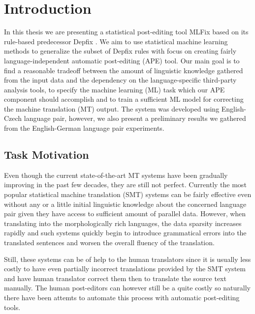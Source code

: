 \chapter{Introduction}

In this thesis we are presenting a statistical post-editing tool MLFix
based on its rule-based predecessor Depfix\cite{depfix:2014}
. We aim to use statistical machine learning methods to generalize the subset of Depfix rules
with focus on creating fairly language-independent automatic post-editing (APE) tool.
Our main goal is to find a reasonable tradeoff between the amount
of linguistic knowledge gathered from the input data and the dependency
on the language-specific third-party analysis tools, to specify the
machine learning (ML) task which our APE component should accomplish and to train
a sufficient ML model for correcting the machine translation (MT) output.
The system was developed using English-Czech language pair, however, we also present
a preliminary results we gathered from the English-German language pair experiments.

\section{Task Motivation}

Even though the current state-of-the-art MT systems have been gradually improving in the
past few decades, they are still not perfect. Currently the most popular statistical machine
translation (SMT) systems can be fairly effective even without any or a little initial
linguistic knowledge about the concerned language pair given they have access to sufficient
amount of parallel data. However, when translating into the morphologically rich languages,
the data sparsity increases rapidly and such systems quickly begin to introduce grammatical
errors into the translated sentences and worsen the overall fluency of the translation.

Still, these systems can be of help to the human translators since it is usually less costly
to have even partially incorrect translations provided by the SMT system and have
human translator correct them then to translate the source text manually.
The human post-editors can however still be a quite costly so naturally there have been
attemts to automate this process with automatic post-editing tools.

